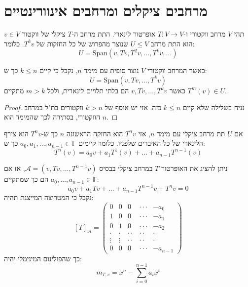 \documentclass{tstextbook}
\begin{document}
\section{מרחבים ציקלים ומרחבים אינוורינטיים}

\begin{definition}
תהי \(V\) מרחב ווקטורי ו-\(T:V\to V\) אופרטור לינארי. התת מרחב ה-\(T\) ציקלי של ווקטור \(v \in V\) הוא התת מרחב \(U\leq V\) שנוצר מהפרוש של כל החזקות של \(T^{k}v\). כלומר:
$$U=\mathrm{Span}\left( v,Tv,T^{2}v, \dots, T^{k}v, \dots \right)$$

\end{definition}
\begin{proposition}
כאשר המרחב ווקטורי \(V\) נוצר סופית עם מימד \(n\), נקבל כי קיים \(k\leq n\) כך ש:
$$U=\mathrm{Span}\left( v,Tv, \dots, T^{k}v \right)$$
כאשר \(v,Tv, \dots, T^{k}v\) הם בלתי תלויים לינארית, ולכל \(m>k\) מתקיים \(T^{m}(v)\in U\).

\end{proposition}
\begin{proof}
נניח בשלילה שלא קיים \(k\leq n\) כזה. אזי יש אוסף של \(k>n\) ווקטורים בת"ל במרחב הווקטורי, בסתירה לכך שהמימד הוא \(n\).

\end{proof}
\begin{corollary}
אם \(U\) תת מרחב ציקלי עם מימד \(n\), אזי \(T^{n}v\) הוא החזקה הראשונה \(n\) כך ש-\(T^{n}v\) הוא צירף הלינארי של כל האיברים שלפניו. כלומר קיימים \(a_{0},a_{1},\dots,a_{n-1}\in \mathbb{F}\) כך ש:
$$T^{n}(v)=a_{0}v+a_{1}T^{1}(v)+ \dots + a_{n-1}T^{n-1}(v)$$

\end{corollary}
\begin{proposition}
ניתן להציג את האופרטור \(T\) במרחב ציקלי בבסיס \(\mathcal{A}=\left( v,Tv, \dots,T^{n-1}v \right)\), אז אם \(a_{0},\dots ,a_{n-1} \in \mathbb{F}\) הם כך שמתקיים:
$$a_{0}v+a_{1}Tv+ \dots + a_{n-1}T^{n-1}v + T^{n}v = 0$$
נקבל כי המטריצה המייצגת תהיה:
$$[T]_{\mathcal{A} }=\begin{pmatrix}0&0&0&\cdot\cdot\cdot&-a_{0}\\ 1&0&0&\cdot\cdot\cdot&-a_{1}\\ 0&1&0&\cdot\cdot\cdot&-a_{2}\\ \cdot&\cdot&\cdot\cdot&\cdot\cdot&\cdot\\ \vdots&\vdots&\cdot\cdot&\cdot\cdot&\cdot\\ 0&0&0&\cdot\cdot\cdot&-a_{n-1}\end{pmatrix}$$
כך שהפולינום המינימלי יהיה:
$$m_{T,v}=x^{n}-\sum_{i=0}^{n-1} a_{i}x^{i}$$

\end{proposition}
\end{document}
